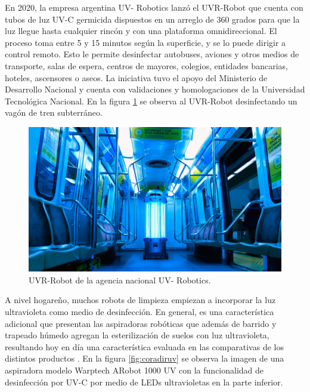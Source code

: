 En 2020, la empresa argentina UV- Robotics lanzó el UVR-Robot \citep{UVR} que cuenta con tubos de luz UV-C germicida dispuestos en un arreglo de 360 grados para que la luz llegue hasta cualquier rincón y con una plataforma omnidireccional. El proceso toma  entre 5 y 15 minutos según la superficie, y se lo puede dirigir a control remoto. Esto le permite desinfectar autobuses, aviones y otros medios de transporte, salas de espera, centros de mayores, colegios, entidades bancarias, hoteles, ascensores o aseos. La iniciativa  tuvo el apoyo del Ministerio de Desarrollo Nacional y cuenta con validaciones y homologaciones de la Universidad Tecnológica Nacional. En la figura \ref{fig:uvrobot} se observa al UVR-Robot desinfectando un vagón de tren subterráneo. 

\begin{figure}[h]
	\centering
	\includegraphics[width=12cm]{./Figures/uvrobot.jpeg}
	\caption{UVR-Robot de la agencia nacional UV- Robotics\protect\footnotemark.}
	\label{fig:uvrobot}
\end{figure}

A nivel hogareño, muchos robots de limpieza empiezan a incorporar la luz ultravioleta como medio de desinfección. En general, es una característica adicional que presentan las aspiradoras robóticas que además de barrido y trapeado húmedo agregan la esterilización de suelos con luz ultravioleta, resultando hoy en día una característica evaluada en las comparativas de los distintos productos  \citep{Bidcom}. En la figura \ref{fig:coradiruv} se observa la imagen de una aspiradora modelo Warptech ARobot 1000 UV con la funcionalidad de desinfección por UV-C por medio de LEDs ultravioletas en la parte inferior.


